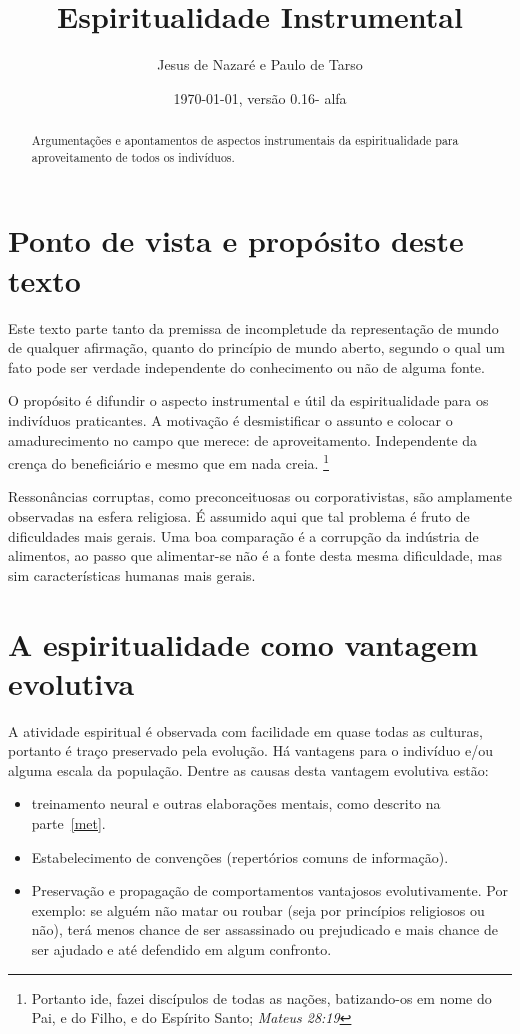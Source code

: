 \documentclass[a4paper]{article}
\title{Espiritualidade Instrumental}
\author{Jesus de Nazaré e Paulo de Tarso}
\date{\today, versão 0.16- alfa}
\begin{document}
\maketitle

\begin{abstract}
Argumentações e apontamentos de aspectos instrumentais da espiritualidade para
aproveitamento de todos os indivíduos.
\end{abstract}

\tableofcontents

\section{Ponto de vista e propósito deste texto}

\qquad Este texto parte tanto da premissa de incompletude da representação de
mundo de qualquer afirmação, quanto do princípio de mundo aberto, segundo o qual
um fato pode ser verdade independente do conhecimento ou não de alguma fonte.

O propósito é difundir o aspecto instrumental e útil da espiritualidade para os
indivíduos praticantes. A motivação é desmistificar o assunto e colocar o
amadurecimento no campo que merece: de aproveitamento. Independente da crença do
beneficiário e mesmo que em nada creia. \footnote{Portanto ide, fazei discípulos
  de todas as nações, batizando-os em nome do Pai, e do Filho, e do Espírito
  Santo; \textit{Mateus 28:19}}

Ressonâncias corruptas, como preconceituosas ou corporativistas, são amplamente
observadas na esfera religiosa. É assumido aqui que tal problema é fruto de
dificuldades mais gerais. Uma boa comparação é a corrupção da indústria de
alimentos, ao passo que alimentar-se não é a fonte desta mesma dificuldade, mas
sim características humanas mais gerais.

\section{A espiritualidade como vantagem evolutiva}

\qquad A atividade espiritual é observada com facilidade em quase todas as
culturas, portanto é traço preservado pela evolução. Há vantagens para o
indivíduo e/ou alguma escala da população. Dentre as causas desta vantagem
evolutiva estão:

\begin{itemize}
  \item treinamento neural e outras elaborações mentais, como descrito na
  parte~\ref{met}.

  \item Estabelecimento de convenções (repertórios comuns de informação).

  \item Preservação e propagação de comportamentos vantajosos evolutivamente.
  Por exemplo: se alguém não matar ou roubar (seja por princípios religiosos ou
  não), terá menos chance de ser assassinado ou prejudicado e mais chance de ser
  ajudado e até defendido em algum confronto.
\end{itemize}
\end{document}
